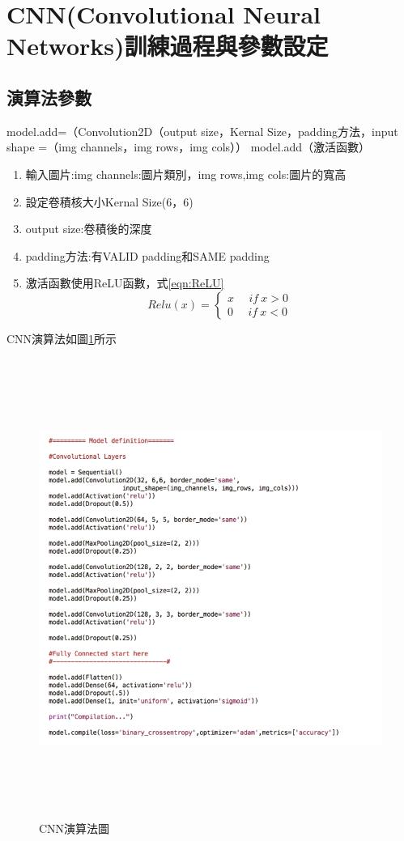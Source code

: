 \section{CNN(Convolutional Neural Networks)訓練過程與參數設定}
\subsection{演算法參數}
model.add=（Convolution2D（output size，Kernal Size，padding方法，input shape =（img channels，img rows，img cols））
model.add（激活函數）
\begin{enumerate}
	\item
	      輸入圖片:img channels:圖片類別，img rows,img cols:圖片的寬高
	\item
	      設定卷積核大小Kernal Size(6，6)
	\item
	      output size:卷積後的深度
	\item
	      padding方法:有VALID padding和SAME padding
	\item
	      激活函數使用ReLU函數，式\ref{eqn:ReLU}
	      \begin{equation}
		      \label{eqn:ReLU}
		      Relu(x)=
		      \left\{\begin{matrix}
			      x \ \ \ \ \ \ if\ x>0
			      \\
			      0 \ \ \ \ \ \ if\ x<0
		      \end{matrix}\right.
	      \end{equation}
\end{enumerate}
CNN演算法如圖\ref{fig:Keras}所示
\begin{figure}[H]
	\centerline{\includegraphics[height=15cm]{pic/Keras.jpg}}
	\caption{CNN演算法圖}
	\label{fig:Keras}
\end{figure}

